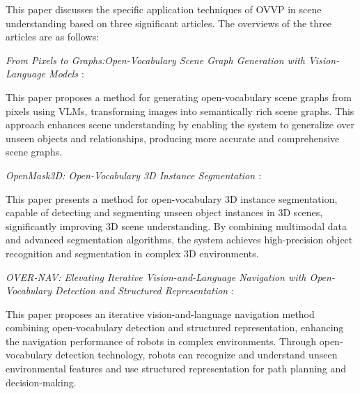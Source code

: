 This paper discusses the specific application techniques of OVVP in scene understanding based on three significant articles. The overviews of the three articles are as follows:

\textit{From Pixels to Graphs:Open-Vocabulary Scene Graph Generation with Vision-Language Models \cite{li2024frompixels}}:

This paper proposes a method for generating open-vocabulary scene graphs from pixels using VLMs, transforming images into semantically rich scene graphs. This approach enhances scene understanding by enabling the system to generalize over unseen objects and relationships, producing more accurate and comprehensive scene graphs.

\textit{OpenMask3D: Open-Vocabulary 3D Instance Segmentation \cite{takmaz2023openmask3d}}:

This paper presents a method for open-vocabulary 3D instance segmentation, capable of detecting and segmenting unseen object instances in 3D scenes, significantly improving 3D scene understanding. By combining multimodal data and advanced segmentation algorithms, the system achieves high-precision object recognition and segmentation in complex 3D environments.

\textit{OVER-NAV: Elevating Iterative Vision-and-Language Navigation with Open-Vocabulary Detection and Structured Representation \cite{zhao2024overnav}}:

This paper proposes an iterative vision-and-language navigation method combining open-vocabulary detection and structured representation, enhancing the navigation performance of robots in complex environments. Through open-vocabulary detection technology, robots can recognize and understand unseen environmental features and use structured representation for path planning and decision-making.


